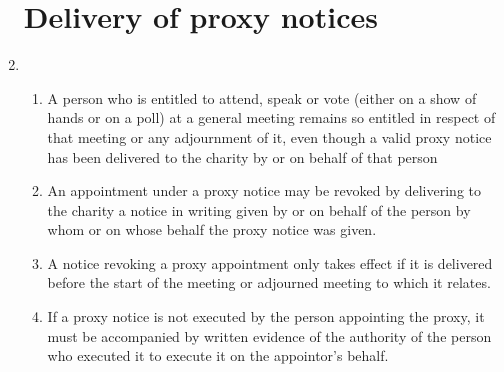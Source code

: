 \documentclass{article}
\begin{document}
\begin{enumerate}[label=\arabic*A, start=22]
    \section{Delivery of proxy notices}
    \item \begin{enumerate}[label=(\arabic*)]
        \item A person who is entitled to attend, speak or vote (either on a
        show of hands or on a poll) at a general meeting remains so
        entitled in respect of that meeting or any adjournment of it,
        even though a valid proxy notice has been delivered to the
        charity by or on behalf of that person
        \item An appointment under a proxy notice may be revoked by
        delivering to the charity a notice in writing given by or on behalf
        of the person by whom or on whose behalf the proxy notice
        was given.
        \item A notice revoking a proxy appointment only takes effect if it is
        delivered before the start of the meeting or adjourned meeting
        to which it relates.
        \item If a proxy notice is not executed by the person appointing the
        proxy, it must be accompanied by written evidence of the
        authority of the person who executed it to execute it on the
        appointor’s behalf.
    \end{enumerate}
\end{enumerate}
\end{document}
